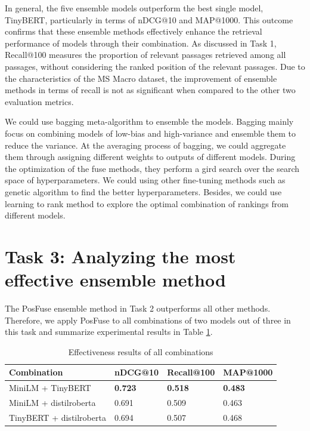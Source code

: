 \documentclass[acmsmall]{acmart}
\begin{document}
In general, the five ensemble models outperform the best single model, TinyBERT, particularly in terms of nDCG@10 and MAP@1000. This outcome confirms that these ensemble methods effectively enhance the retrieval performance of models through their combination. As discussed in Task 1, Recall@100 measures the proportion of relevant passages retrieved among all passages, without considering the ranked position of the relevant passages. Due to the characteristics of the MS Macro dataset, the improvement of ensemble methods in terms of recall is not as significant when compared to the other two evaluation metrics.

We could use bagging meta-algorithm to ensemble the models. Bagging mainly focus on combining models of low-bias and high-variance and ensemble them to reduce the variance. At the averaging process of bagging, we could aggregate them through assigning different weights to outputs of different models. During the optimization of the fuse methods, they perform a gird search over the search space of hyperparameters. We could using other fine-tuning methods such as genetic algorithm to find the better hyperparameters. Besides, we could use learning to rank method to explore the optimal combination of rankings from different models.

\section{Task 3: Analyzing the most effective ensemble method}
The PosFuse ensemble method in Task 2 outperforms all other methods. Therefore, we apply PosFuse to all combinations of two models out of three in this task and summarize experimental results in Table \ref{tab:results-task3}.
\begin{table}[!ht]
    \centering
    \caption{Effectiveness results of all combinations}
    \label{tab:results-task3}
    \begin{tabular}{llll}
       \toprule
       \textbf{Combination} & \textbf{nDCG@10} & \textbf{Recall@100} & \textbf{MAP@1000}\\
       \midrule
       MiniLM + TinyBERT & \textbf{0.723} & \textbf{0.518} & \textbf{0.483}\\
       MiniLM + distilroberta & 0.691 & 0.509 & 0.463\\
       TinyBERT + distilroberta & 0.694 & 0.507 & 0.468\\
       \bottomrule
    \end{tabular}
\end{table}
\end{document}
